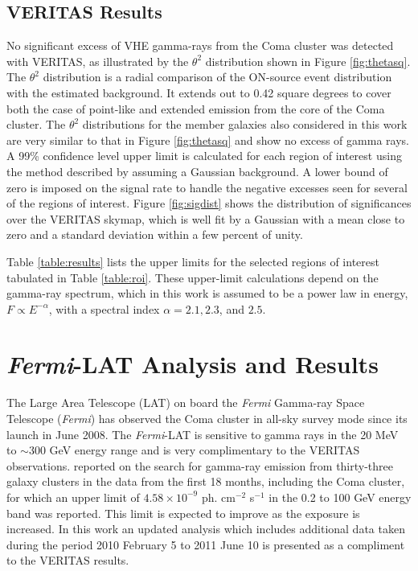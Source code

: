 \documentclass[12pt,manuscript]{aastex}
\def\Fermi{{\em Fermi}\xspace}
\begin{document}
\subsection{VERITAS Results}
No significant excess of VHE gamma-rays from the Coma cluster was detected with VERITAS, as
illustrated by the $\theta^{2}$ distribution shown in Figure \ref{fig:thetasq}. The $\theta^{2}$
distribution is a radial comparison of the ON-source event distribution with the estimated
background. It extends out to 0.42 square degrees to cover both the case of point-like and extended
emission from the core of the Coma cluster. The $\theta^{2}$ distributions for the member galaxies
also considered in this work are very similar to that in Figure \ref{fig:thetasq} and show no
excess of gamma rays. A 99\% confidence level upper limit is calculated for each region of
interest using the method described by \citet{article:Rolke_etal:2005} assuming a Gaussian
background. A lower bound of zero is imposed on the signal rate to handle the negative excesses
seen for several of the regions of interest. Figure \ref{fig:sigdist} shows the distribution of
significances over the VERITAS skymap, which is well fit by a Gaussian with a mean close to zero and
a standard deviation within a few percent of unity.

Table \ref{table:results} lists the upper limits for the selected regions of interest tabulated in
Table \ref{table:roi}. These upper-limit calculations depend on the gamma-ray spectrum, which in
this work is assumed to be a power law in energy, $F\propto E^{-\alpha}$, with a spectral index
$\alpha=2.1, 2.3$, and $2.5$.

%
%

\section{\Fermi-LAT Analysis and Results}
The Large Area Telescope (LAT) on board the \Fermi Gamma-ray Space Telescope (\Fermi)
has observed the Coma cluster in all-sky survey mode since its launch in June 2008. The
\Fermi-LAT is sensitive to gamma rays in the 20 MeV to $\sim$300 GeV energy range and is
very complimentary to the VERITAS observations. \citet{article:Ackermann_etal:2010} reported on the
search for gamma-ray emission from thirty-three galaxy clusters in the data from the first 18
months, including the Coma cluster, for which an upper limit of $4.58\times 10^{-9}$ ph. cm$^{-2}$
s$^{-1}$ in the 0.2 to 100 GeV energy band was reported. This limit is expected to improve as the
exposure is increased. In this work an updated analysis which includes additional data taken during
the period 2010 February 5 to 2011 June 10 is presented as a compliment to the VERITAS results.
\end{document}
